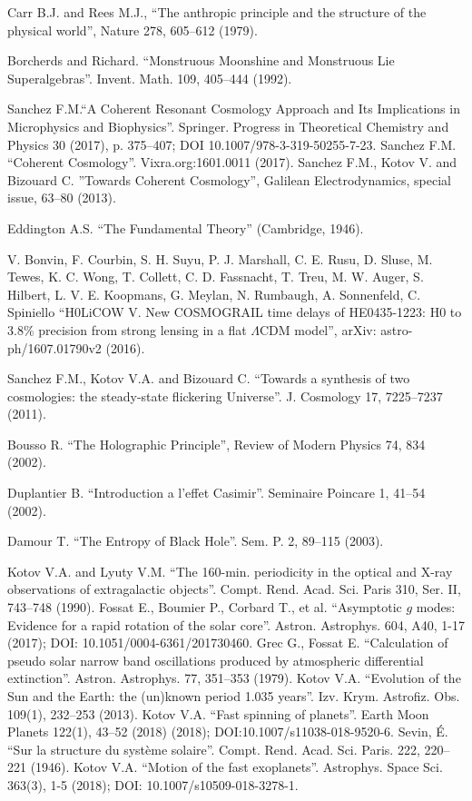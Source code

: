 \documentclass[twoside,draft]{article}
\begin{document}
\begin{sloppypar}
\begin{thebibliography}{99}\footnotesize

 Carr B.J. and Rees M.J., ``The anthropic principle and the
structure of the physical world'', Nature 278, 605--612 (1979).

 Borcherds and Richard. ``Monstruous Moonshine and Monstruous Lie
Superalgebras''. Invent. Math. 109, 405--444 (1992).

 Sanchez F.M.``A Coherent Resonant Cosmology Approach and Its Implications in Microphysics and Biophysics''. Springer. Progress in Theoretical Chemistry and Physics 30 (2017), p. 375--407; DOI 10.1007/978-3-319-50255-7-23.  Sanchez F.M. ``Coherent Cosmology''. Vixra.org:1601.0011 (2017). Sanchez F.M., Kotov V. and Bizouard C. ''Towards Coherent Cosmology'', Galilean Electrodynamics, special issue, 63--80 (2013).

 Eddington A.S. ``The Fundamental Theory'' (Cambridge, 1946).

 V. Bonvin, F. Courbin, S. H. Suyu, P. J. Marshall, C. E. Rusu, D. Sluse, M. Tewes, K. C. Wong, T. Collett, C. D. Fassnacht, T. Treu, M. W. Auger, S. Hilbert, L. V. E. Koopmans, G. Meylan, N. Rumbaugh, A. Sonnenfeld, C. Spiniello ``H0LiCOW V. New COSMOGRAIL time delays of HE0435-1223: H0 to 3.8\% precision from strong lensing in a flat $\Lambda$CDM model'', arXiv: astro-ph/1607.01790v2 (2016).

 Sanchez F.M., Kotov V.A. and Bizouard C. ``Towards a synthesis of
two cosmologies: the steady-state flickering Universe''. J. Cosmology 17,
7225--7237 (2011).

 Bousso R. ``The Holographic Principle'', Review of Modern Physics
74, 834 (2002).

 Duplantier B. ``Introduction a l'effet Casimir''. Seminaire
Poincare 1, 41--54 (2002).

 Damour T. ``The Entropy of Black Hole''. Sem. P. 2, 89--115 (2003).

 Kotov V.A. and Lyuty V.M. ``The 160-min. periodicity in the optical
and X-ray observations of extragalactic objects''. Compt. Rend. Acad. Sci.
Paris 310, Ser. II, 743--748 (1990). Fossat E., Boumier P., Corbard T., et al.
``Asymptotic $g$ modes: Evidence for a rapid rotation of the solar core''.
Astron. Astrophys. 604, A40, 1-17 (2017); DOI: 10.1051/0004-6361/201730460.
Grec G., Fossat E. ``Calculation of pseudo solar narrow band oscillations
produced by atmospheric differential extinction''. Astron. Astrophys. 77,
351--353 (1979). Kotov V.A. ``Evolution of the Sun and the Earth: the (un)known
period 1.035 years''. Izv. Krym. Astrofiz. Obs. 109(1), 232--253 (2013).
Kotov V.A. ``Fast spinning of planets''. Earth Moon Planets 122(1), 43--52
(2018) (2018); DOI:10.1007/s11038-018-9520-6. Sevin, \'E. ``Sur la structure du
syst\`eme solaire''. Compt. Rend. Acad. Sci. Paris. 222, 220--221 (1946).
Kotov V.A. ``Motion of the fast exoplanets''. Astrophys. Space Sci. 363(3), 1-5
(2018); DOI: 10.1007/s10509-018-3278-1.


\end{thebibliography}
\end{sloppypar}
\end{document}
